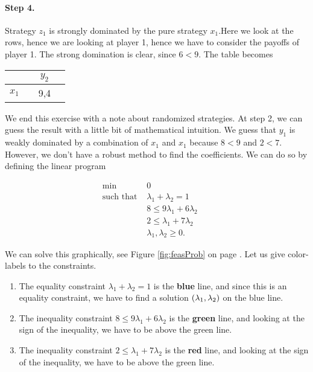 \paragraph{Step 4.} Strategy $z_{1}$ is strongly dominated by the pure strategy $x_{1}$.Here we look at the rows, hence we are looking at player 1, hence we have to consider the payoffs of player 1. The strong domination is clear, since $6 < 9$. The table becomes

\begin{tabular}[h!]{l|ccc}
		&& $y_2$ \\
		\hline
		$x_1$ && 9,4 &
	\end{tabular} 
	

\vspace{10mm}

We end this exercise with a note about randomized strategies. At step 2, we can guess the result with a little bit of mathematical intuition. We guess that $y_1$ is weakly dominated by a combination of $x_{1}$ and $x_{1}$ because $8 < 9$ and $2 < 7$. However, we don't have a robust method to find the coefficients. We can do so by defining the linear program


        

\begin{equation*}
    \begin{aligned}
    \underset{}{\text{min }} &
    0 & & \\
    \text{such that  } &
        \lambda_{1} + \lambda_{2} = 1 & \\
        & 8 \leq 9 \lambda_{1} + 6 \lambda_{2} &  \\
        & 2 \leq \lambda_{1} + 7 \lambda_{2} & \\
        & \lambda_{1}, \lambda_{2} \geq 0. &
    \end{aligned}
\end{equation*}
   

We can solve this graphically, see Figure \ref{fig:feasProb} on page \pageref{fig:feasProb}. Let us give color-labels to the constraints.
\begin{enumerate}
    \item The equality constraint $\lambda_{1} + \lambda_{2} = 1$ is the \textbf{blue} line, and since this is an equality constraint, we have to find a solution $\left(\lambda_{1}, \lambda_{2}\right)$ on the blue line.
    \item The inequality constraint $8 \leq 9 \lambda_{1} + 6 \lambda_{2}$ is the \textbf{green} line, and looking at the sign of the inequality, we have to be above the green line.
    \item The inequality constraint $2 \leq \lambda_{1} + 7 \lambda_{2}$ is the \textbf{red} line, and looking at the sign of the inequality, we have to be above the green line.
\end{enumerate}


